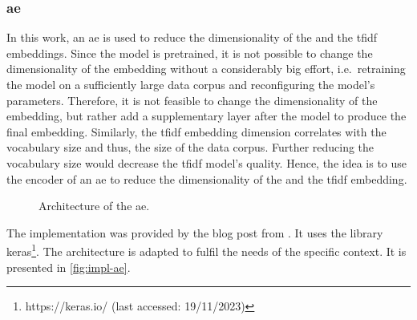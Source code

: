 \subsubsection*{\acl{ae}}\label{subsubsec:impl-autoencoder}

In this work, an \ac{ae} is used to reduce the dimensionality of the \infersent{} and the \ac{tfidf} embeddings.
Since the \infersent{} model is pretrained, it is not possible to change the dimensionality of the embedding without a considerably big effort,
i.e.\ retraining the model on a sufficiently large data corpus and reconfiguring the model's parameters.
Therefore, it is not feasible to change the dimensionality of the \infersent{} embedding, but rather add a supplementary layer after the model 
to produce the final embedding.
Similarly, the \ac{tfidf} embedding dimension correlates with the vocabulary size and thus, the size of the data corpus.
Further reducing the vocabulary size would decrease the \ac{tfidf} model's quality.
Hence, the idea is to use the encoder of an \ac{ae} to reduce the dimensionality of the \infersent{} and the \ac{tfidf} embedding.

\begin{figure}[!htp] %
    \centering
    
    \caption[Architecture of the \acs*{ae}]{Architecture of the \acs*{ae}.}
    \label{fig:impl-ae}
\end{figure}

The implementation was provided by the blog post from \cite{impl-src-ae}.
It uses the library keras\footnote{https://keras.io/ (last accessed: 19/11/2023)}.
The architecture is adapted to fulfil the needs of the specific context.
It is presented in \autoref{fig:impl-ae}.